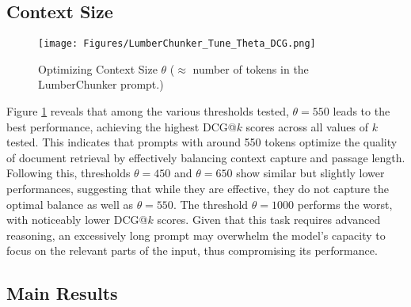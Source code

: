 \subsection{Context Size}
\label{sec:tuning_theta}

\begin{figure}
    \centering
    \texttt{[image: Figures/LumberChunker\_Tune\_Theta\_DCG.png]}
    \caption{Optimizing Context Size $\theta$ ($\approx$ number of tokens in the LumberChunker prompt.)}
    \label{fig:dcg_theta_tune}
\end{figure}

Figure \ref{fig:dcg_theta_tune} reveals that among the various thresholds tested, \(\theta = 550\) leads to the best performance, achieving the highest DCG@$k$ scores across all values of \(k\) tested. This indicates that prompts with around 550 tokens optimize the quality of document retrieval by effectively balancing context capture and passage length. Following this, thresholds \(\theta = 450\) and \(\theta = 650\) show similar but slightly lower performances, suggesting that while they are effective, they do not capture the optimal balance as well as \(\theta = 550\). The threshold \(\theta = 1000\) performs the worst, with noticeably lower DCG@$k$ scores. Given that this task requires advanced reasoning, an excessively long prompt may overwhelm the model's capacity to focus on the relevant parts of the input, thus compromising its performance.


\subsection{Main Results}

